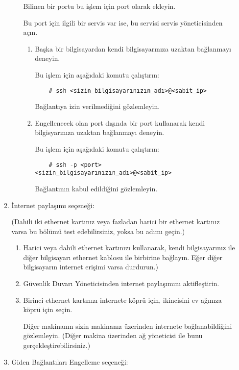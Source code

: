 \documentclass[a4paper,10pt]{article}
\begin{document}
\begin{enumerate}
\begin{enumerate}
\begin{enumerate}
	Bilinen bir portu bu işlem için port olarak ekleyin.

	Bu port için ilgili bir servis var ise, bu servisi servis yöneticisinden açın.

        \begin{enumerate}
            \item Başka bir bilgisayardan kendi bilgisayarınıza uzaktan bağlanmayı deneyin.

	Bu işlem için aşağıdaki komutu çalıştırın:
	\begin{verbatim}
	# ssh <sizin_bilgisayarınızın_adı>@<sabit_ip>
	\end{verbatim}
	Bağlantıya izin verilmediğini gözlemleyin.

       \item Engellenecek olan port dışında bir port kullanarak kendi bilgisyarınıza uzaktan bağlanmayı deneyin.

	Bu işlem için aşağıdaki komutu çalıştırın:
	\begin{verbatim}
	# ssh -p <port> <sizin_bilgisayarınızın_adı>@<sabit_ip>
	\end{verbatim}
                 Bağlantının kabul edildiğini gözlemleyin.
        \end{enumerate}
    \end{enumerate}
    \item İnternet paylaşımı seçeneği: 

	(Dahili iki ethernet kartınız veya fazladan harici bir ethernet kartınız varsa bu bölümü test edebilirsiniz, yoksa bu adımı geçin.)

        \begin{enumerate}
        \item Harici veya dahili ethernet kartınızı kullanarak, kendi bilgisayarınız ile diğer bilgisayarı ethernet kablosu ile birbirine bağlayın. Eğer diğer bilgisayarın internet erişimi varsa durdurun.)

        \item Güvenlik Duvarı Yöneticisinden internet paylaşımını aktifleştirin.

        \item Birinci ethernet kartınızı internete köprü için, ikincisini ev ağınıza köprü için seçin.

              Diğer makinanın sizin makinanız üzerinden internete bağlanabildiğini gözlemleyin. (Diğer makina üzerinden ağ yöneticisi ile bunu gerçekleştirebilirsiniz.) 
        \end{enumerate}
    \item Giden Bağlantıları Engelleme seçeneği:


\end{enumerate}
\end{enumerate}
\end{document}
